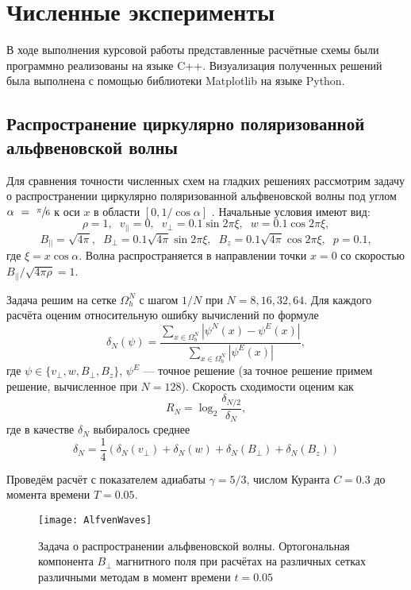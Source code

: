 \documentclass[12pt, a4paper]{article}
\begin{document}
 	\section{Численные эксперименты}
 	В ходе выполнения курсовой работы представленные расчётные схемы были программно реализованы на языке C++. Визуализация полученных решений была выполнена с помощью библиотеки Matplotlib на языке Python.
 		\subsection{Распространение циркулярно поляризованной альфвеновской волны}
 		Для сравнения точности численных схем на гладких решениях рассмотрим задачу о распространении циркулярно поляризованной альфвеновской волны под углом $\alpha~=~\sfrac\pi6$ к оси $x$ в области $[0, 1/\cos\alpha]$ \cite{Lukin}. Начальные условия имеют вид:
 		\[
 		\rho = 1, \phantom{x} v_{||}=0, \phantom{x} v_{\perp} = 0.1\sin2\pi\xi,\phantom{x} w=0.1\cos2\pi\xi,
 		\]
 		\[
 		B_{||}=\sqrt{4\pi},\phantom{x} B_{\perp} = 0.1\sqrt{4\pi}\sin2\pi\xi,\phantom{x} B_z =0.1\sqrt{4\pi}\cos2\pi\xi,\phantom{x} p =0.1,
 		\]
 		где $\xi = x\cos\alpha$. Волна распространяется в направлении точки $x=0$ со скоростью $B_{||}/\sqrt{4\pi\rho}=1$. 
 		
 		Задача решим на сетке $\Omega_h^N$ с шагом $1/N$ при $N=8,16,32,64$. Для каждого расчёта оценим относительную ошибку вычислений по формуле 
 		\[
 			\delta_N(\psi) = \dfrac{\displaystyle\sum_{x\in\Omega_h^N}|\psi^N(x)-\psi^E(x)|}{\displaystyle\sum_{x\in\Omega_h^N}|\psi^E(x)|},
 		\]
 		где $\psi \in \{v_{\perp},w,B_{\perp},B_z\}$, $\psi^E$ --- точное решение (за точное решение примем решение, вычисленное при $N=128$). Скорость сходимости оценим как
 		\[
 		R_N = \log_2\dfrac{\delta_{N/2}}{\delta_N},
 		\]
 		где в качестве $\delta_N$ выбиралось среднее
 		\[
 		\delta_N = \dfrac14 (\delta_N(v_{\perp}) + \delta_N(w) + \delta_N(B_{\perp}) + \delta_N(B_z))
 		\]
 		
 		Проведём расчёт с показателем адиабаты $\gamma = 5/3$, числом Куранта $C=0.3$ до момента времени $T = 0.05$.
 		
 			\begin{figure}[H]
 			\centering
 			\hspace*{0mm}\texttt{[image: AlfvenWaves]}
 			\caption{Задача о распространении альфвеновской волны. Ортогональная компонента $B_\perp$ магнитного поля при расчётах на различных сетках различными методам в момент времени $t=0.05$}
 		\end{figure}
\end{document}
